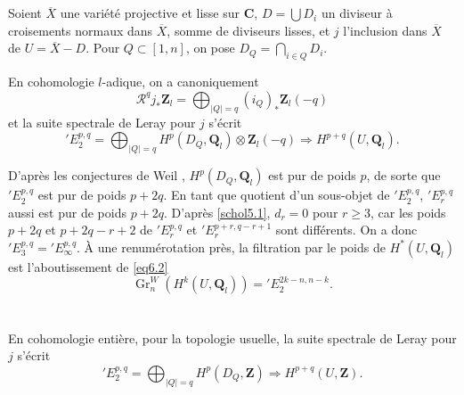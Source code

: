 \documentclass[12pt]{amsart}
\theoremstyle{definition}
\DeclareMathOperator{\Gr}{Gr}
\newcommand{\Q}{\mathbf{Q}}
\newcommand{\Z}{\mathbf{Z}}
\newcommand{\C}{\mathbf{C}}
\begin{document}
\section{}\label{sec6}

Soient $\overline{X}$ une variété projective et lisse sur $\C$, $D = \bigcup D_{i}$ un diviseur à croisements normaux dans $\overline{X}$, somme de diviseurs lisses, et $j$ l'inclusion dans $\overline{X}$ de $U = \overline{X} - D$. Pour $Q \subset [1,n]$, on pose $D_{Q} = \bigcap_{i \in Q} D_{i}$.

En cohomologie $l$-adique, on a canoniquement
\begin{equation}\label{eq6.1}
\mathscr{R}^{q}j_{*}\Z_{l} = \bigoplus_{|Q|=q} (i_{Q})_{*}\Z_{l}(-q)
\end{equation}
et la suite spectrale de Leray pour $j$ s'écrit
\begin{equation}\label{eq6.2}
{}'\!E_{2}^{p,q} = \bigoplus_{|Q|=q} H^{p}(D_{Q}, \Q_{l}) \otimes \Z_{l}(-q) \Rightarrow H^{p+q}(U, \Q_{l}).
\end{equation}

D'après les conjectures de Weil \cite{Weil}, $H^{p}(D_{Q}, \Q_{l})$ est pur de poids $p$, de sorte que $'\!E_{2}^{p,q}$ est pur de poids $p+2q$. En tant que quotient d'un sous-objet de $'\!E_{2}^{p,q}$, $'\!E_{r}^{p,q}$ aussi est pur de poids $p+2q$. D'après \ref{schol5.1}, $d_{r} = 0$ pour $r \geqslant 3$, car les poids $p+2q$ et $p+2q-r+2$ de $'\!E_{r}^{p,q}$ et $'\!E_{r}^{p+r,q-r+1}$ sont différents. On a donc $'\!E_{3}^{p,q} = '\!E_{\infty}^{p,q}$. À une renumérotation près, la filtration par le poids de $H^{*}(U, \Q_{l})$ est l'aboutissement de \eqref{eq6.2}
\begin{equation}\label{eq6.3}
\Gr_{n}^{W}(H^{k}(U, \Q_{l})) = '\!E_{2}^{2k-n,n-k}.
\end{equation}

\section{}\label{sec7}

En cohomologie entière, pour la topologie usuelle, la suite spectrale de Leray pour $j$ s'écrit
\begin{equation}\label{eq7.1}
'\!E_{2}^{p,q} = \bigoplus_{|Q|=q} H^{p}(D_{Q}, \Z) \Rightarrow H^{p+q}(U, \Z).
\end{equation}
\end{document}

